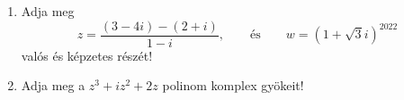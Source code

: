 \documentclass[11pt]{scrartcl}
\begin{document}
\begin{enumerate}
	\item Adja meg
	      \[
		      z = \frac{(3 - 4i) - (2 + i)}{1 - i}, \qquad \text{és} \qquad
		      w = \left( 1 + \sqrt{3} i \right)^{2022}
	      \]
	      valós és képzetes részét!

	\item Adja meg a $z^3 + i z^2 + 2z$ polinom komplex gyökeit!
\end{enumerate}
\end{document}
